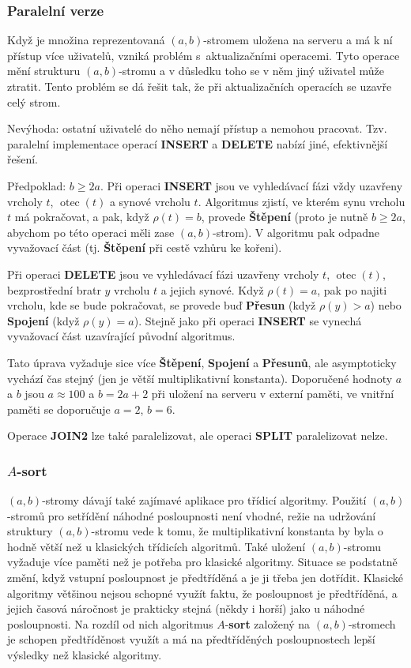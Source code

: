 \documentclass[a4paper,12pt]{article}
\DeclareMathOperator*{\otec}{otec}
\begin{document}
\subsubsection{Paralelní verze}


Když je množina reprezentovaná $(a,b)$-stromem 
uložena na serveru a má k ní přístup více 
uživatelů, vzniká problém s~aktualizačními 
operacemi. Tyto operace mění strukturu $(a,b)$-stromu a 
v důsledku toho se v něm jiný uživatel 
může ztratit. Tento problém se dá  
řešit tak, že při aktu\-alizačních operacích 
se uzavře celý strom.


Nevýhoda: ostatní uživatelé  
do něho nemají přístup a nemohou pracovat. Tzv. paralelní 
implementace operací {\bf INSERT} a {\bf DELETE} nabízí jiné, 
efektivnější řešení.

Předpoklad: $b\ge 2a$. \newline 
Při operaci {\bf INSERT} jsou ve vyhledávací fázi vždy 
uzavřeny vrcholy $t$, $\otec(t)$ a synové vrcholu $t$. 
Algoritmus zjistí, ve kterém synu vrcholu $t$ má 
pokračovat, a pak, když $\rho (t)=b$, provede {\bf Štěpení }
(proto je nutně $b\ge 2a$, abychom po této ope\-raci měli 
zase $(a,b)$-strom). V algoritmu pak odpadne vyva\-žo\-vací 
část (tj. {\bf Štěpení} při cestě vzhůru ke 
kořeni).

Při operaci {\bf DELETE} jsou ve vyhledávací fázi uzavřeny 
vrcholy $t$, $\otec(t)$, bezprostřední bratr $y$ vrcholu $
t$ a 
jejich synové. 
Když $\rho (t)=a$, pak po najiti vrcholu, kde se bude 
pokračovat, se provede buď {\bf Přesun} (když $\rho (
y)>a$) nebo 
{\bf Spojení} (když $\rho (y)=a$). Stejně jako při operaci 
{\bf INSERT} se vynechá vyva\-žo\-vací část 
uzavírající původní algoritmus.

Tato úprava vyžaduje sice více {\bf Štěpení}, {\bf Spojení} a
{\bf Přesunů}, ale asymptoticky vychází čas stejný 
(jen je větší multiplikativní konstanta). Doporučené 
hodnoty $a$ a $b$ jsou $a\approx 100$ a $b=2a+2$ při uložení na serveru 
v externí paměti, ve vnitřní paměti 
se doporučuje $a=2$, $b=6$.

Operace {\bf JOIN2} lze také paralelizovat, ale operaci {\bf SPLIT  }
paralelizovat nelze.

\subsubsection{$A$-{\bf sort}}

$(a,b)$-stromy dávají také zajímavé aplikace pro 
třídicí 
algoritmy. Použití $(a,b)$-stromů pro setřídění 
náhodné posloupnosti není vhodné, režie na udržování 
struktury $(a,b)$-stromu vede k tomu, že multiplikativní 
konstanta by byla o hodně větší než u klasických 
třídicích algoritmů. Také uložení $(
a,b)$-stromu 
vyžaduje více paměti než je potřeba pro klasické 
algoritmy. Situace se podstatně změní, když vstupní 
posloupnost je před\-tří\-děná a je ji třeba jen dotřídit. 
Klasické algoritmy většinou nejsou schopné využít faktu, že 
posloupnost je předtříděná, a jejich časová náročnost je 
prakticky stejná (někdy i horší) jako u náhodné 
posloupnosti. Na rozdíl od nich algoritmus $A$-{\bf sort }
založený na $(a,b)$-stromech je schopen předtříděnost 
využít a má na předtříděných posloupnostech lepší 
výsledky než klasické algoritmy.
\end{document}
